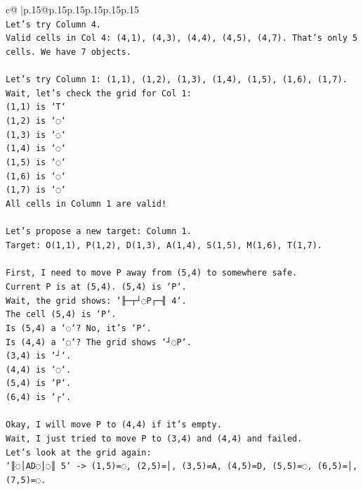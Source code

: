 \documentclass{article}
\begin{document}
{\begin{supertabular}{c@{$\;$}|p{.15\linewidth}@{}p{.15\linewidth}p{.15\linewidth}p{.15\linewidth}p{.15\linewidth}p{.15\linewidth}}
{{{\\ 
\texttt{Let's try Column 4.} \\
\texttt{Valid cells in Col 4: (4,1), (4,3), (4,4), (4,5), (4,7). That's only 5 cells. We have 7 objects.} \\
\\ 
\texttt{Let's try Column 1: (1,1), (1,2), (1,3), (1,4), (1,5), (1,6), (1,7).} \\
\texttt{Wait, let's check the grid for Col 1:} \\
\texttt{(1,1) is `T`} \\
\texttt{(1,2) is `◌`} \\
\texttt{(1,3) is `◌`} \\
\texttt{(1,4) is `◌`} \\
\texttt{(1,5) is `◌`} \\
\texttt{(1,6) is `◌`} \\
\texttt{(1,7) is `◌`} \\
\texttt{All cells in Column 1 are valid!} \\
\\ 
\texttt{Let's propose a new target: Column 1.} \\
\texttt{Target: O(1,1), P(1,2), D(1,3), A(1,4), S(1,5), M(1,6), T(1,7).} \\
\\ 
\texttt{First, I need to move P away from (5,4) to somewhere safe.} \\
\texttt{Current P is at (5,4). (5,4) is `P`.} \\
\texttt{Wait, the grid shows: `╟─┬┘◌P┌─╢ 4`.} \\
\texttt{The cell (5,4) is `P`.} \\
\texttt{Is (5,4) a `◌`? No, it's `P`.} \\
\texttt{Is (4,4) a `◌`? The grid shows `┘◌P`.} \\
\texttt{(3,4) is `┘`.} \\
\texttt{(4,4) is `◌`.} \\
\texttt{(5,4) is `P`.} \\
\texttt{(6,4) is `┌`.} \\
\\ 
\texttt{Okay, I will move P to (4,4) if it's empty.} \\
\texttt{Wait, I just tried to move P to (3,4) and (4,4) and failed.} \\
\texttt{Let's look at the grid again:} \\
\texttt{`║◌│AD◌│◌║ 5` {-}> (1,5)=◌, (2,5)=│, (3,5)=A, (4,5)=D, (5,5)=◌, (6,5)=│, (7,5)=◌.} \\
}}}
\end{supertabular}}
\end{document}
